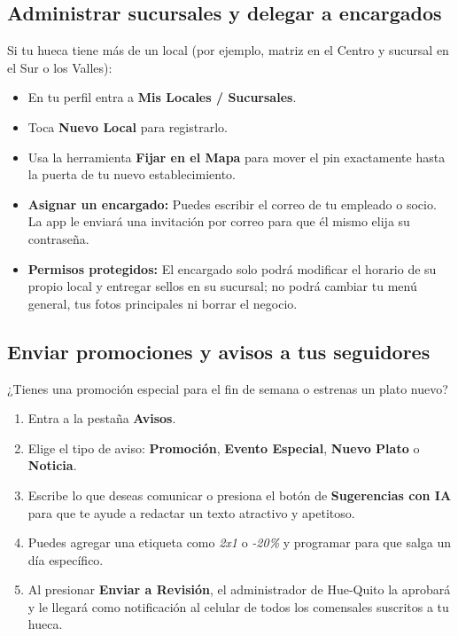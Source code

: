 \documentclass[11pt, a4paper, oneside]{article}
\begin{document}
\subsection{Administrar sucursales y delegar a encargados}
Si tu hueca tiene más de un local (por ejemplo, matriz en el Centro y sucursal en el Sur o los Valles):
\begin{itemize}
  \item En tu perfil entra a \textbf{Mis Locales / Sucursales}.
  \item Toca \textbf{Nuevo Local} para registrarlo.
  \item Usa la herramienta \textbf{Fijar en el Mapa} para mover el pin exactamente hasta la puerta de tu nuevo establecimiento.
  \item \textbf{Asignar un encargado:} Puedes escribir el correo de tu empleado o socio. La app le enviará una invitación por correo para que él mismo elija su contraseña.
  \item \textbf{Permisos protegidos:} El encargado solo podrá modificar el horario de su propio local y entregar sellos en su sucursal; no podrá cambiar tu menú general, tus fotos principales ni borrar el negocio.
\end{itemize}

\subsection{Enviar promociones y avisos a tus seguidores}
¿Tienes una promoción especial para el fin de semana o estrenas un plato nuevo?
\begin{enumerate}
  \item Entra a la pestaña \textbf{Avisos}.
  \item Elige el tipo de aviso: \textbf{Promoción}, \textbf{Evento Especial}, \textbf{Nuevo Plato} o \textbf{Noticia}.
  \item Escribe lo que deseas comunicar o presiona el botón de \textbf{Sugerencias con IA} para que te ayude a redactar un texto atractivo y apetitoso.
  \item Puedes agregar una etiqueta como \textit{2x1} o \textit{-20\%} y programar para que salga un día específico.
  \item Al presionar \textbf{Enviar a Revisión}, el administrador de Hue-Quito la aprobará y le llegará como notificación al celular de todos los comensales suscritos a tu hueca.
\end{enumerate}

\end{document}
